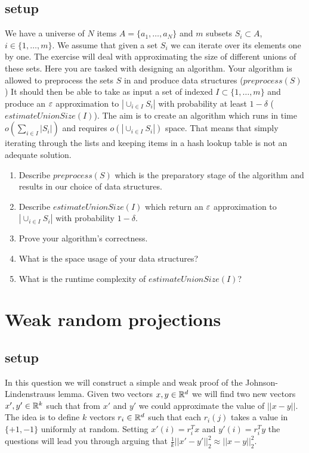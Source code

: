 \subsection*{setup}
We have a universe of $N$ items $A = \{a_1,\ldots, a_N\}$
and $m$ subsets $S_i \subset A$, $i \in \{1,\ldots,m\}$.
We assume that given a set $S_i$ we can iterate over its elements one by one.
The exercise will deal with approximating the size of different unions of these sets.  
Here you are tasked with designing an algorithm. 
Your algorithm is allowed to preprocess the sets $S$ in and produce data structures ($preprocess(S)$)
It should then be able to take as input a set of indexed $I \subset \{1,\ldots,m\}$ and produce
an $\varepsilon$ approximation to $|\cup_{i \in I}S_i|$ with probability at least $1-\delta$ ($estimateUnionSize(I)$).
The aim is to create an algorithm which runs in time $o(\sum_{i \in I}|S_i|)$ and requires $o(|\cup_{i \in I}S_i|)$ space. 
That means that simply iterating through the lists and keeping items in a hash lookup table is not an adequate solution. 

\begin{enumerate}
\item Describe $preprocess(S)$ which is the preparatory stage of the algorithm and results in our choice of data structures.
\item Describe $estimateUnionSize(I)$ which return an $\varepsilon$ approximation to $|\cup_{i \in I}S_i|$ with probability $1-\delta$.
\item Prove your algorithm's correctness.
\item What is the space usage of your data structures?
\item What is the runtime complexity of $estimateUnionSize(I)$?
\end{enumerate}


\pagebreak


\section{Weak random projections}
\subsection*{setup}
In this question we will construct a simple and weak proof of the Johnson-Lindenstrauss lemma. 
Given two vectors $x,y \in{\mathbb{R}}^{d}$ we will find two new vectors $x',y'\in {\mathbb{R}}^{k}$ such that from $x'$ and
$y'$ we could approximate the value of $||x-y||$. The idea is to
define $k$ vectors $r_i \in {\mathbb{R}}^{d}$ such that each $r_i(j)$ takes a
value in $\{+1,-1\}$ uniformly at random. Setting $x'(i) =
r_{i}^{T}x$ and $y'(i) = r_{i}^{T}y$ the questions will lead you through arguing that
$\frac{1}{k}||x' -y'||_{2}^{2} \approx ||x-y||_{2}^{2}$.

